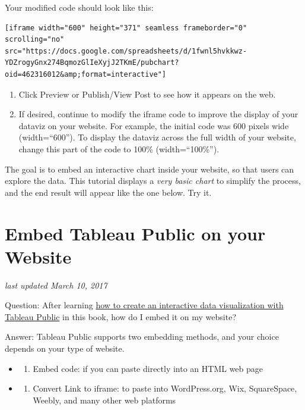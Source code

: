 \documentclass[
  english,
]{book}
\providecommand{\tightlist}{%
  \setlength{\itemsep}{0pt}\setlength{\parskip}{0pt}}
\begin{document}
Your modified code should look like this:

\begin{verbatim}
[iframe width="600" height="371" seamless frameborder="0" scrolling="no" src="https://docs.google.com/spreadsheets/d/1fwnl5hvkkwz-YDZrogyGnx274BqmozGlIeXyjJ2TKmE/pubchart?oid=462316012&amp;format=interactive"]
\end{verbatim}

\begin{enumerate}
\def\labelenumi{\arabic{enumi})}
\setcounter{enumi}{8}
\item
  Click Preview or Publish/View Post to see how it appears on the web.
\item
  If desired, continue to modify the iframe code to improve the display of your dataviz on your website. For example, the initial code was 600 pixels wide (width=``600''). To display the dataviz across the full width of your website, change this part of the code to 100\% (width=``100\%'').
\end{enumerate}

The goal is to embed an interactive chart inside your website, so that users can explore the data. This tutorial displays a \emph{very basic chart} to simplify the process, and the end result will appear like the one below. Try it.

\hypertarget{iframe-tableau}{%
\section{Embed Tableau Public on your Website}\label{iframe-tableau}}

\emph{last updated March 10, 2017}

Question: After learning \href{tableau-public}{how to create an interactive data visualization with Tableau Public} in this book, how do I embed it on my website?

Answer: Tableau Public supports two embedding methods, and your choice depends on your type of website.

\begin{itemize}
\item
  \begin{enumerate}
  \def\labelenumi{\Alph{enumi})}
  \tightlist
  \item
    Embed code: if you can paste directly into an HTML web page
  \end{enumerate}
\item
  \begin{enumerate}
  \def\labelenumi{\Alph{enumi})}
  \setcounter{enumi}{1}
  \tightlist
  \item
    Convert Link to iframe: to paste into WordPress.org, Wix, SquareSpace, Weebly, and many other web platforms
  \end{enumerate}
\end{itemize}
\end{document}
